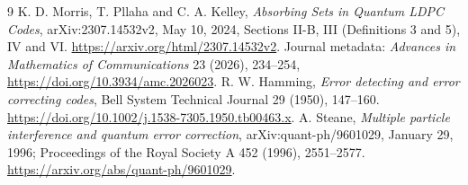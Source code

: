 \documentclass[11pt]{article}
\begin{document}
\begin{thebibliography}{9}
 K. D. Morris, T. Pllaha and C. A. Kelley,
\emph{Absorbing Sets in Quantum LDPC Codes}, arXiv:2307.14532v2,
May 10, 2024, Sections II-B, III (Definitions 3 and 5), IV and VI.
\url{https://arxiv.org/html/2307.14532v2}.
Journal metadata: \emph{Advances in Mathematics of Communications} 23
(2026), 234--254, \url{https://doi.org/10.3934/amc.2026023}.
 R. W. Hamming, \emph{Error detecting and error correcting
codes}, Bell System Technical Journal 29 (1950), 147--160.
\url{https://doi.org/10.1002/j.1538-7305.1950.tb00463.x}.
 A. Steane, \emph{Multiple particle interference and quantum
error correction}, arXiv:quant-ph/9601029, January 29, 1996;
Proceedings of the Royal Society A 452 (1996), 2551--2577.
\url{https://arxiv.org/abs/quant-ph/9601029}.
\end{thebibliography}
\appendix

\end{document}
